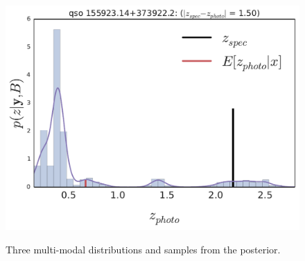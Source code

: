 \documentclass{article}
\begin{document}
\begin{figure}[t]
{\includegraphics[width=.56\columnwidth]{../../figs/quasar_plots/quasar_554_posterior_z}
}
\vskip -0.2in
\caption{ Three multi-modal distributions and samples from the posterior.}
\label{fig:recon}
\vskip -0.2in
\end{figure}
%
%
%
\end{document}
